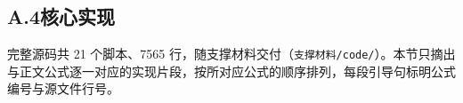 \subsection*{A.4\quad 核心实现}

完整源码共 21 个脚本、7565 行，随支撑材料交付（\texttt{支撑材料/code/}）。本节只摘出与正文公式逐一对应的实现片段，按所对应公式的顺序排列，每段引导句标明公式编号与源文件行号。

